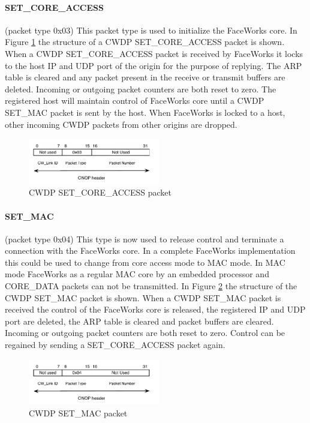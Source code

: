 \documentclass[conference]{IEEEtran}
\begin{document}
\paragraph*{SET\_CORE\_ACCESS} (packet type 0x03) This packet type is used to initialize the FaceWorks core. In Figure \ref{fig:cwdp-core-access} the structure of a CWDP SET\_CORE\_ACCESS packet is shown. When a CWDP SET\_CORE\_ACCESS packet is received by FaceWorks it locks to the host IP and UDP port of the origin for the purpose of replying. The ARP table is cleared and any packet present in the receive or transmit buffers are deleted. Incoming or outgoing packet counters are both reset to zero. The registered host will maintain control of FaceWorks core until a CWDP SET\_MAC packet is sent by the host. When FaceWorks is locked to a host, other incoming CWDP packets from other origins are dropped.

\begin{figure}[h]
  \centering
      \includegraphics[height=2cm]{Diagrams/CWDP-Set-core-access.pdf}
  \caption{CWDP SET\_CORE\_ACCESS packet}
  \label{fig:cwdp-core-access}
\end{figure}

\paragraph*{SET\_MAC} (packet type 0x04) This type is now used to release control and terminate a connection with the FaceWorks core. In a complete FaceWorks implementation this could be used to change from core access mode to MAC mode. In MAC mode FaceWorks as a regular MAC core by an embedded processor and CORE\_DATA packets can not be transmitted.  In Figure \ref{fig:mac-access} the structure of the CWDP SET\_MAC packet is shown. When a CWDP SET\_MAC packet is received the control of the FaceWorks core is released, the registered IP and UDP port are deleted, the ARP table is cleared and packet buffers are cleared. Incoming or outgoing packet counters are both reset to zero. Control can be regained by sending a SET\_CORE\_ACCESS packet again.

\begin{figure}[H]
  \centering
      \includegraphics[height=2cm]{Diagrams/CWDP-Set-MAC.pdf}
  \caption{CWDP SET\_MAC packet}
  \label{fig:mac-access}
\end{figure}
\end{document}
